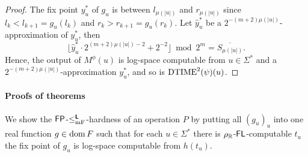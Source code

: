 \documentclass[envcountsame,orivec,oribibl]{llncs}
\begin{document}
\begin{proof}
 The fix point $y^*_u$ of $g_u$ is between $l_{\mu(|u|)}$ and $r_{\mu(|u|)}$ 
 since $l_k < l_{k+1} = g_u(l_k)$ and $r_k > r_{k+1} = g_u(r_k)$.
 Let $\hat y^*_u$ be a $2^{-(m+2)\mu(|u|)}$-approximation of $y^*_u$, then
\begin{equation}
 \lfloor \hat y^*_u \cdot 2^{(m+2)\mu(|u|)-2} + 2^{-2}\rfloor  \bmod 2^m
  =
  \overline{S_{\mu(|u|)}}.
\end{equation}
 Hence, the output of $M^\phi(u)$ is log-space computable from 
 $u \in \Sigma^*$ and a $2^{-(m+2)\mu(|u|)}$-approximation $y^*_u$, and so is
 $\mathrm{DTIME}^2(\psi)(u)$.
\end{proof}



\paragraph{Proofs of theorems}
\label{section:proofs-of-theorems}

We show the $\mathsf{FP}$-$\leq _{\mathrm{mF}} ^{\text{\bfseries \sffamily \upshape L}}$-hardness of an operation $P$
by putting all $(g_u)_u$ into one real function $g \in \mathop{\rm dom} F$
such that for each $u \in \Sigma^*$ there is $\rho _\mathbb R$-$\mathsf{FL}$-computable
$t_u$ the fix point of $g_u$ is log-space computable from $h(t_u)$.
\end{document}
